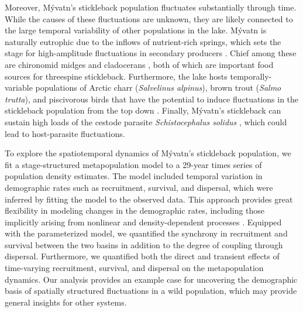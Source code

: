 \documentclass[11pt]{article}
\begin{document}
Moreover, M\'{y}vatn's stickleback population fluctuates substantially through time.
While the causes of these fluctuations are unknown, 
they are likely connected to the large temporal variability 
of other populations in the lake.
M\'{y}vatn is naturally eutrophic due to the inflows of nutrient-rich springs,
which sets the stage for high-amplitude fluctuations in secondary producers
\citep{einarsson2004myvatn}.
Chief among these are chironomid midges and cladocerans
\citep{einarsson2002, einarsson2004clad, gardarsson2004population, ives2008},
both of which are important food sources for threespine stickleback.
Furthermore, the lake hosts temporally-variable populations 
of Arctic charr (\textit{Salvelinus alpinus}), 
brown trout (\textit{Salmo trutta}), 
and piscivorous birds that have the potential 
to induce fluctuations in the stickleback population from the top down
\citep{einarsson2004moulting, gudbergsson2004}.
Finally, M\'{y}vatn's stickleback can sustain high loads of the cestode parasite
\textit{Schistocephalus solidus} \citep{gislason1998, karvonen2013},
which could lead to host-parasite fluctuations.

To explore the spatiotemporal dynamics of M\'{y}vatn's stickleback population, 
we fit a stage-structured metapopulation model \citep{caswell2001matrix}
to a 29-year times series of population density estimates.
The model included temporal variation in demographic rates 
such as recruitment, survival, and dispersal,
which were inferred by fitting the model to the observed data.
This approach provides great flexibility in modeling changes in the demographic rates,
including those implicitly arising from nonlinear and density-dependent processes
\citep{zeng1998, ives2012}.
Equipped with the parameterized model, 
we quantified the synchrony in recruitment and survival between the two basins
in addition to the degree of coupling through dispersal.
Furthermore, we quantified both the direct and transient effects of 
time-varying recruitment, survival, and dispersal
on the metapopulation dynamics.
Our analysis provides an example case for uncovering the demographic basis 
of spatially structured fluctuations in a wild population, 
which may provide general insights for other systems. 




\end{document}
